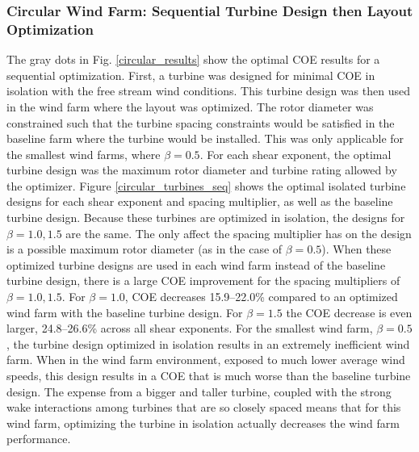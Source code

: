 \documentclass[wes, manuscript]{copernicus}
\begin{document}
\subsubsection{Circular Wind Farm: Sequential Turbine Design then Layout Optimization}
The gray dots in Fig. \ref{circular_results} show the optimal COE results for a sequential optimization. First, a turbine was designed for minimal COE in isolation with the free stream wind conditions. This turbine design was then used in the wind farm where the layout was optimized. 
The rotor diameter was constrained such that the turbine spacing constraints would be satisfied in the baseline farm where the turbine would be installed. This was only applicable for the smallest wind farms, where $\beta=0.5$. 
For each shear exponent, the optimal turbine design was the maximum rotor diameter and turbine rating allowed by the optimizer.
Figure \ref{circular_turbines_seq} shows the optimal isolated turbine designs for each shear exponent and spacing multiplier, as well as the baseline turbine design. Because these turbines are optimized in isolation, the designs for $\beta=1.0,1.5$ are the same. The only affect the spacing multiplier has on the design is a possible maximum rotor diameter (as in the case of $\beta=0.5$).
When these optimized turbine designs are used in each wind farm instead of the baseline turbine design, there is a large COE improvement for the spacing multipliers of $\beta=1.0, 1.5$. For $\beta=1.0$, COE decreases 15.9--22.0\% compared to an optimized wind farm with the baseline turbine design. For $\beta=1.5$ the COE decrease is even larger, 24.8--26.6\% across all shear exponents. 
For the smallest wind farm, $\beta=0.5$, the turbine design optimized in isolation results in an extremely inefficient wind farm. When in the wind farm environment, exposed to much lower average wind speeds, this design results in a COE that is much worse than the baseline turbine design. The expense from a bigger and taller turbine, coupled with the strong wake interactions among turbines that are so closely spaced means that for this wind farm, optimizing the turbine in isolation actually decreases the wind farm performance. 
\end{document}
